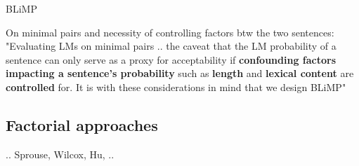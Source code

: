 BLiMP

On minimal pairs and necessity of controlling factors btw the two sentences:
"Evaluating LMs on minimal pairs .. the caveat that the LM probability of a sentence can only serve as a proxy for acceptability if \textbf{confounding factors impacting a sentence’s probability} such as \textbf{length} and \textbf{lexical content} are \textbf{controlled} for. It is with these considerations in mind that we design BLiMP"


\subsection{Factorial approaches}
..
Sprouse, Wilcox, Hu, ..






